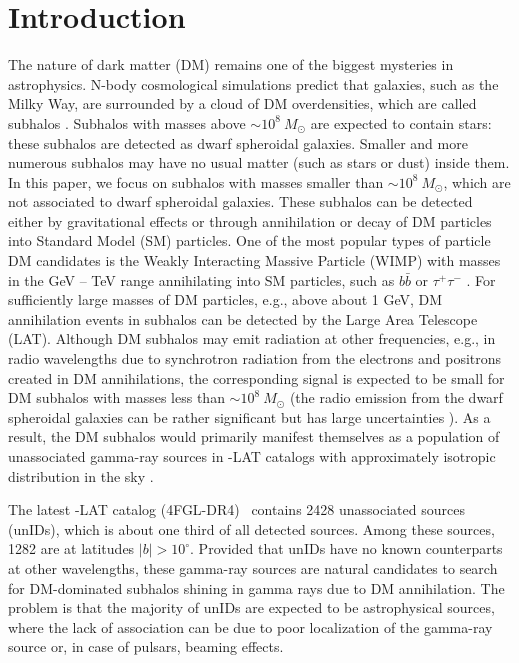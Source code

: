 \section{Introduction}
\label{sec: intro}
The nature of dark matter (DM) remains one of the biggest mysteries in astrophysics.
N-body cosmological simulations predict that galaxies, such as the Milky Way, are surrounded by a cloud of DM overdensities, which are called subhalos \cite{2001MNRAS.328..726S,2007ApJ...667..859D,2008Natur.454..735D,2009Sci...325..970K,2012AnP...524..507F,2019Galax...7...81Z,2020NatRP...2...42V}.
Subhalos with masses above ${\sim 10^8~M_{\odot}}$ are expected to contain stars: these subhalos are detected as dwarf spheroidal galaxies.
Smaller and more numerous subhalos may have no usual matter (such as stars or dust) inside them.
In this paper, we focus on subhalos with masses smaller than ${\sim 10^8~M_{\odot}}$, which are not associated to
dwarf spheroidal galaxies.
These subhalos can be detected either by gravitational effects or through annihilation or decay of DM particles into Standard Model (SM) particles.
One of the most popular types of particle DM candidates is the Weakly Interacting Massive Particle (WIMP) with masses in the GeV -- TeV range annihilating into SM particles, such as $b\bar{b}$ or $\tau^+\tau^-$ 
\cite{2016PhR...636....1C, 2017NatPh..13..224C, MiniReview_Gammaldi}.
For sufficiently large masses of DM particles, e.g., above about 1 GeV, DM annihilation events in subhalos can be detected by the {\Fermi} Large Area Telescope (LAT).
Although DM subhalos may emit radiation at other frequencies, e.g., in radio wavelengths due to synchrotron radiation from the electrons and positrons created in DM annihilations, the corresponding signal is expected to be small for DM subhalos with masses less than ${\sim 10^8~M_{\odot}}$ \cite{2015JCAP...02..032C} (the radio emission from the dwarf spheroidal galaxies can be rather significant but has large uncertainties \cite{2007PhRvD..75b3513C, 2013PhRvD..88h3535N, 2014JCAP...10..016R}).
As a result, the DM subhalos would primarily manifest themselves as a population of unassociated gamma-ray sources in {\Fermi}-LAT catalogs with approximately isotropic distribution in the sky 
\DMsubhaloUnas.


The latest \Fermi-LAT catalog (4FGL-DR4)~\cite{2022ApJS..260...53A, 2023arXiv230712546B} contains 2428 unassociated sources (unIDs), which is about one third of all detected sources.
Among these sources, 1282 are at latitudes $|b| > 10^\circ$.
Provided that unIDs have no known counterparts at other wavelengths, these gamma-ray sources are natural candidates to search for DM-dominated subhalos shining in gamma rays
due to DM annihilation.
The problem is that the majority of unIDs are expected to be astrophysical sources, where the lack of association can be due to poor localization of the gamma-ray source or, in case of pulsars, beaming effects.

